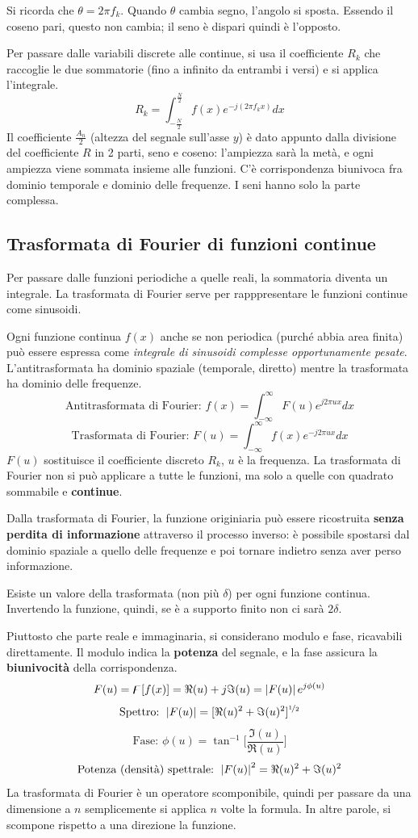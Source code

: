 Si ricorda che $\theta = 2\pi f_k$. Quando $\theta$ cambia segno, l'angolo si sposta. Essendo il coseno pari, questo non cambia; il seno è dispari quindi è l'opposto. 

Per passare dalle variabili discrete alle continue, si usa il coefficiente $R_k$ che raccoglie le due sommatorie (fino a infinito da entrambi i versi) e si applica l'integrale. 
$$R_k = \int_{-\frac{N}{2}}^{\frac{N}{2}} f(x)e^{-j(2\pi f_kx)} dx$$
Il coefficiente $\frac{A_n}{2}$ (altezza del segnale sull'asse $y$) è dato appunto dalla divisione del coefficiente $R$ in 2 parti, seno e coseno: l'ampiezza sarà la metà, e ogni ampiezza viene sommata insieme alle funzioni. C'è corrispondenza biunivoca fra dominio temporale e dominio delle frequenze. I seni hanno solo la parte complessa.

\subsection{Trasformata di Fourier di funzioni continue}
Per passare dalle funzioni periodiche a quelle reali, la sommatoria diventa un integrale. La trasformata di Fourier serve per rapppresentare le funzioni continue come sinusoidi.

Ogni funzione continua $f(x)$ anche se non periodica (purché abbia area finita) può essere espressa come \textit{integrale di sinusoidi complesse opportunamente pesate}. L'antitrasformata ha dominio spaziale (temporale, diretto) mentre la trasformata ha dominio delle frequenze.
$$\text{Antitrasformata di Fourier: } f(x) = \int_{-\infty}^{\infty} F(u)e^{j2\pi ux} dx$$
$$\text{Trasformata di Fourier: } F(u) = \int_{-\infty}^{\infty} f(x)e^{-j2\pi ux} dx$$
$F(u)$ sostituisce il coefficiente discreto $R_k$, $u$ è la frequenza. La trasformata di Fourier non si può applicare a tutte le funzioni, ma solo a quelle con quadrato sommabile e \textbf{continue}.

Dalla trasformata di Fourier, la funzione originiaria può essere ricostruita \textbf{senza perdita di informazione} attraverso il processo inverso: è possibile spostarsi dal dominio spaziale a quello delle frequenze e poi tornare indietro senza aver perso informazione.

Esiste un valore della trasformata (non più $\delta$) per ogni funzione continua. Invertendo la funzione, quindi, se è a supporto finito non ci sarà $2\delta$.

Piuttosto che parte reale e immaginaria, si considerano modulo e fase, ricavabili direttamente. Il modulo indica la \textbf{potenza} del segnale, e la fase assicura la \textbf{biunivocità} della corrispondenza. 
$$F(u) = \digamma[f(x)] = \Re(u) + j\Im(u) = \left|F(u)\right|e^{j\phi(u)}$$
$$\text{Spettro: } \left|F(u)\right| = [\Re(u)^2 + \Im(u)^2]^{\nicefrac{1}{2}}$$
$$\text{Fase: } \phi(u) = \tan^{-1} \Big[\frac{\Im(u)}{\Re(u)}\Big]$$
$$\text{Potenza (densità) spettrale: } \left|F(u)\right|^2 = \Re(u)^2 + \Im(u)^2$$
La trasformata di Fourier è un operatore scomponibile, quindi per passare da una dimensione a $n$ semplicemente si applica $n$ volte la formula. In altre parole, si scompone rispetto a una direzione la funzione.

